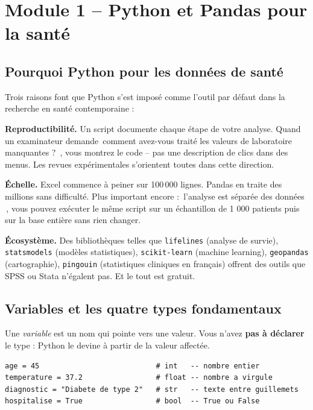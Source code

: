 \documentclass[11pt,a4paper]{article}
\providecommand{\og}{\guillemotleft\,}
\providecommand{\fg}{\,\guillemotright}
\begin{document}

\section{Module 1 -- Python et Pandas pour la sant\'e}

\subsection{Pourquoi Python pour les donn\'ees de sant\'e}

Trois raisons font que Python s'est impos\'e comme l'outil par d\'efaut
dans la recherche en sant\'e contemporaine :

\textbf{Reproductibilit\'e.} Un script documente chaque \'etape de votre
analyse. Quand un examinateur demande \og comment avez-vous trait\'e les
valeurs de laboratoire manquantes ? \fg{}, vous montrez le code -- pas
une description de clics dans des menus. Les revues exp\'erimentales
s'orientent toutes dans cette direction.

\textbf{\'Echelle.} Excel commence \`a peiner sur 100\,000 lignes. Pandas
en traite des millions sans difficult\'e. Plus important encore :
\og l'analyse est s\'epar\'ee des donn\'ees \fg{}, vous pouvez ex\'ecuter
le m\^eme script sur un \'echantillon de 1 000 patients puis sur la base
enti\`ere sans rien changer.

\textbf{\'Ecosyst\`eme.} Des biblioth\`eques telles que \texttt{lifelines}
(analyse de survie), \texttt{statsmodels} (mod\`eles statistiques),
\texttt{scikit-learn} (machine learning), \texttt{geopandas}
(cartographie), \texttt{pingouin} (statistiques cliniques en fran\c{c}ais)
offrent des outils que SPSS ou Stata n'\'egalent pas. Et le tout est
gratuit.

\subsection{Variables et les quatre types fondamentaux}

Une \emph{variable} est un nom qui pointe vers une valeur. Vous n'avez
\textbf{pas \`a d\'eclarer} le type : Python le devine \`a partir de la
valeur affect\'ee.

\begin{verbatim}
age = 45                           # int   -- nombre entier
temperature = 37.2                 # float -- nombre a virgule
diagnostic = "Diabete de type 2"   # str   -- texte entre guillemets
hospitalise = True                 # bool  -- True ou False
\end{verbatim}
\end{document}
